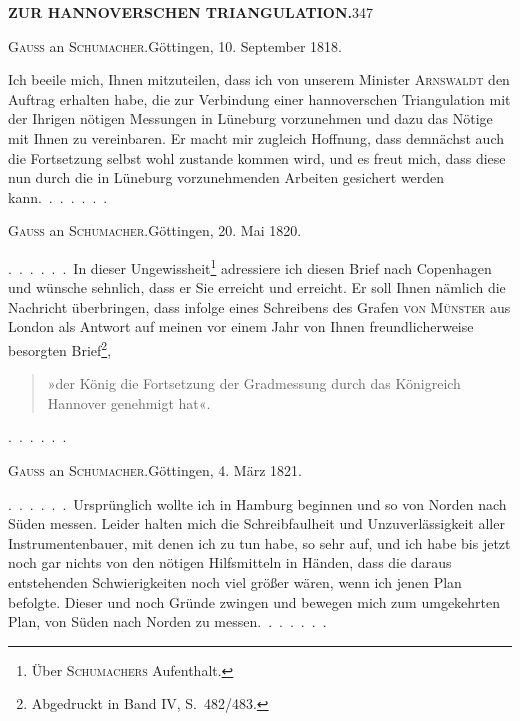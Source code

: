 \noindent\textbf{ZUR HANNOVERSCHEN TRIANGULATION.}\hfill347
\begin{center}\textsc{Gauss} an \textsc{Schumacher}.\quad Göttingen, 10. September 1818.\end{center}

Ich beeile mich, Ihnen mitzuteilen, dass ich von unserem Minister \textsc{Arnswaldt} den
Auftrag erhalten habe, die zur Verbindung einer hannoverschen Triangulation mit
der Ihrigen nötigen Messungen in Lüneburg vorzunehmen und dazu das
Nötige mit Ihnen zu vereinbaren. Er macht mir zugleich Hoffnung, dass
demnächst auch die Fortsetzung selbst wohl zustande kommen wird, und
es freut mich, dass diese nun durch die in Lüneburg vorzunehmenden Arbeiten
gesichert werden kann.\ .\ .\ .\ .\ .\ .

\begin{center}\textsc{Gauss} an \textsc{Schumacher}.\quad Göttingen, 20. Mai 1820.\end{center}
\begingroup
\makeatletter
\renewcommand{\@makefnmark}{\hbox{\normalfont[\textsuperscript{*})]}}
\long{}
\makeatother
\par\noindent\hspace*{\parindent}.\ .\ .\ .\ .\ .\ In dieser Ungewissheit\footnote{Über \textsc{Schumachers} Aufenthalt.} adressiere ich diesen Brief nach Copenhagen
und wünsche sehnlich, dass er Sie erreicht und  erreicht. Er
soll Ihnen nämlich die Nachricht überbringen, dass infolge eines Schreibens
des Grafen \textsc{von Münster} aus London als Antwort auf meinen vor einem Jahr
\makeatletter
\renewcommand{\@makefnmark}{\hbox{\normalfont[\textsuperscript{**})]}}
\long\def\@makefntext#1{\parindent1.5em\noindent[\textsuperscript{**})\ #1]}
\makeatother
von Ihnen freundlicherweise besorgten Brief\footnote{Abgedruckt in Band IV, S.~482/483.},
\begin{quote}
»der König die Fortsetzung der Gradmessung durch das Königreich
Hannover genehmigt hat«.
\end{quote}
\par\medskip
.\ .\ .\ .\ .\ .
\endgroup

\begin{center}\textsc{Gauss} an \textsc{Schumacher}.\quad Göttingen, 4. März 1821.\end{center}

.\ .\ .\ .\ .\ .\ Ursprünglich wollte ich in Hamburg beginnen und so
von Norden nach Süden messen. Leider halten mich die
Schreibfaulheit und Unzuverlässigkeit aller Instrumentenbauer, mit denen ich zu tun
habe, so sehr auf, und ich habe bis jetzt noch gar nichts von den nötigen
Hilfsmitteln in Händen, dass die daraus entstehenden Schwierigkeiten
noch viel größer wären, wenn ich jenen Plan befolgte. Dieser und noch
 Gründe zwingen und bewegen mich
zum umgekehrten Plan, von Süden nach Norden zu messen.\ .\ .\ .\ .\ .\ .
\par
\makeatletter
\insert{}
\makeatother


